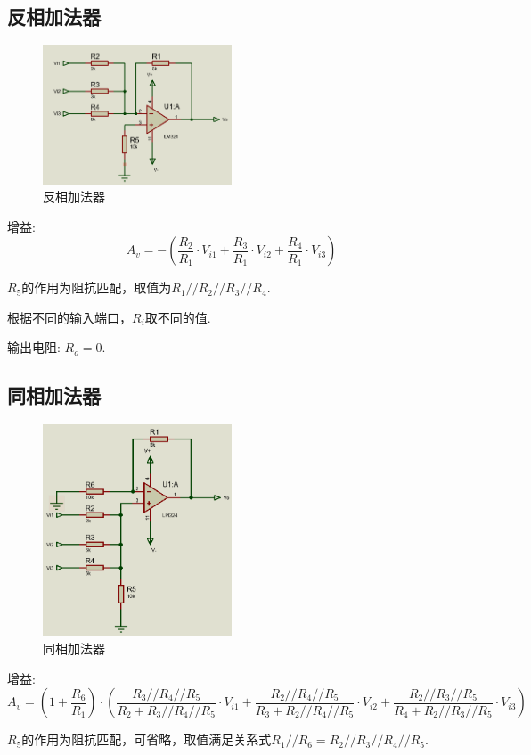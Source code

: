 \documentclass[a4paper,11pt,UTF8]{article}
\begin{document}
\subsection{反相加法器}
\begin{figure}[H]
	\centering
	\includegraphics[width=0.5\textwidth]{反相加法器}
	\caption{反相加法器}
\end{figure}
增益:
$$A_v=-(\frac{R_2}{R_1}\cdot V_{i1}+\frac{R_3}{R_1}\cdot V_{i2}+\frac{R_4}{R_1}\cdot V_{i3})$$

$R_5$的作用为阻抗匹配，取值为$R_1//R_2//R_3//R_4$.

根据不同的输入端口，$R_i$取不同的值.

输出电阻: $R_o = 0$.
\subsection{同相加法器}
\begin{figure}[H]
	\centering
	\includegraphics[width=0.5\textwidth]{同相加法器}
	\caption{同相加法器}
\end{figure}
增益:
$$A_v=(1+\frac{R_6}{R_1})\cdot(\frac{R_3//R_4//R_5}{R_2+R_3//R_4//R_5}\cdot V_{i1}+\frac{R_2//R_4//R_5}{R_3+R_2//R_4//R_5}\cdot V_{i2}+\frac{R_2//R_3//R_5}{R_4+R_2//R_3//R_5}\cdot V_{i3})$$

$R_5$的作用为阻抗匹配，可省略，取值满足关系式$R_1//R_6=R_2//R_3//R_4//R_5$.
\end{document}
